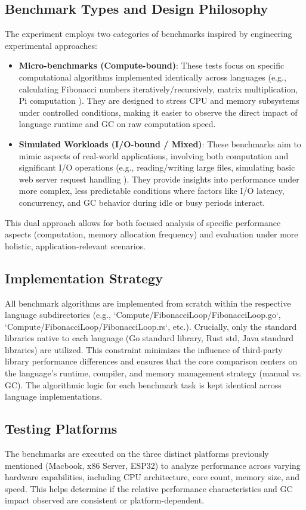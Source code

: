 
\subsection{Benchmark Types and Design Philosophy}

The experiment employs two categories of benchmarks inspired by engineering experimental approaches:

\begin{itemize}
    \item \textbf{Micro-benchmarks (Compute-bound)}: These tests focus on specific computational algorithms implemented identically across languages (e.g., calculating Fibonacci numbers iteratively/recursively, matrix multiplication, Pi computation ). They are designed to stress CPU and memory subsystems under controlled conditions, making it easier to observe the direct impact of language runtime and GC on raw computation speed.
    \item \textbf{Simulated Workloads (I/O-bound / Mixed)}: These benchmarks aim to mimic aspects of real-world applications, involving both computation and significant I/O operations (e.g., reading/writing large files, simulating basic web server request handling ). They provide insights into performance under more complex, less predictable conditions where factors like I/O latency, concurrency, and GC behavior during idle or busy periods interact.
\end{itemize}
This dual approach allows for both focused analysis of specific performance aspects (computation, memory allocation frequency) and evaluation under more holistic, application-relevant scenarios.

\subsection{Implementation Strategy}

All benchmark algorithms are implemented from scratch within the respective language subdirectories (e.g., `Compute/FibonacciLoop/FibonacciLoop.go`, `Compute/FibonacciLoop/FibonacciLoop.rs`, etc.). Crucially, only the standard libraries native to each language (Go standard library, Rust std, Java standard libraries) are utilized. This constraint minimizes the influence of third-party library performance differences and ensures that the core comparison centers on the language's runtime, compiler, and memory management strategy (manual vs. GC). The algorithmic logic for each benchmark task is kept identical across language implementations.

\subsection{Testing Platforms} %

The benchmarks are executed on the three distinct platforms previously mentioned (Macbook, x86 Server, ESP32) to analyze performance across varying hardware capabilities, including CPU architecture, core count, memory size, and speed. This helps determine if the relative performance characteristics and GC impact observed are consistent or platform-dependent.
